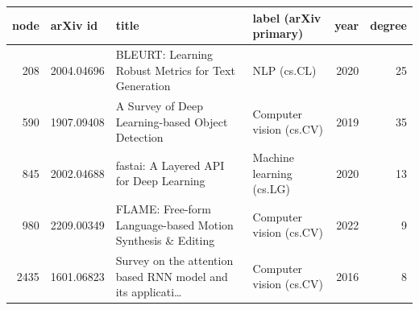 \begin{tabular}{rlllrr}
\toprule
node & arXiv id & title & label (arXiv primary) & year & degree \\
\midrule
208 & 2004.04696 & BLEURT: Learning Robust Metrics for Text Generation & NLP (cs.CL) & 2020 & 25 \\
590 & 1907.09408 & A Survey of Deep Learning-based Object Detection & Computer vision (cs.CV) & 2019 & 35 \\
845 & 2002.04688 & fastai: A Layered API for Deep Learning & Machine learning (cs.LG) & 2020 & 13 \\
980 & 2209.00349 & FLAME: Free-form Language-based Motion Synthesis \& Editing & Computer vision (cs.CV) & 2022 & 9 \\
2435 & 1601.06823 & Survey on the attention based RNN model and its applicati… & Computer vision (cs.CV) & 2016 & 8 \\
\bottomrule
\end{tabular}
